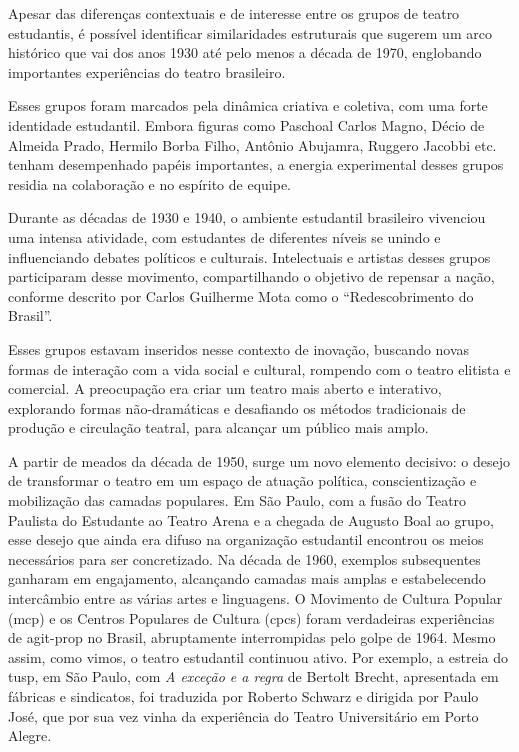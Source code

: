 \subject{Arco histórico}

Apesar das diferenças contextuais e de interesse entre os grupos de
teatro estudantis, é possível identificar similaridades estruturais que
sugerem um arco histórico que vai dos anos 1930 até pelo menos a década
de 1970, englobando importantes experiências do teatro brasileiro.

Esses grupos foram marcados pela dinâmica criativa e coletiva, com uma
forte identidade estudantil. Embora figuras como Paschoal Carlos Magno,
Décio de Almeida Prado, Hermilo Borba Filho, Antônio Abujamra, Ruggero
Jacobbi etc. tenham desempenhado papéis importantes, a energia
experimental desses grupos residia na colaboração e no espírito de
equipe.

Durante as décadas de 1930 e 1940, o ambiente estudantil brasileiro
vivenciou uma intensa atividade, com estudantes de diferentes níveis se
unindo e influenciando debates políticos e culturais. Intelectuais e
artistas desses grupos participaram desse movimento, compartilhando o
objetivo de repensar a nação, conforme descrito por Carlos Guilherme
Mota como o “Redescobrimento do Brasil”.

Esses grupos estavam inseridos nesse contexto de inovação, buscando
novas formas de interação com a vida social e cultural, rompendo com o
teatro elitista e comercial. A preocupação era criar um teatro mais
aberto e interativo, explorando formas não-dramáticas e desafiando os
métodos tradicionais de produção e circulação teatral, para alcançar um
público mais amplo.

A partir de meados da década de 1950, surge um novo elemento decisivo: o
desejo de transformar o teatro em um espaço de atuação política,
conscientização e mobilização das camadas populares. Em São Paulo, com a
fusão do Teatro Paulista do Estudante ao Teatro Arena e a chegada de
Augusto Boal ao grupo, esse desejo que ainda era difuso na organização
estudantil encontrou os meios necessários para ser concretizado. Na
década de 1960, exemplos subsequentes ganharam em engajamento,
alcançando camadas mais amplas e estabelecendo intercâmbio entre as
várias artes e linguagens. O Movimento de Cultura Popular ({\sc mcp}) e os
Centros Populares de Cultura ({\sc cpc}s) foram verdadeiras experiências de
agit-prop no Brasil, abruptamente interrompidas pelo golpe de 1964.
Mesmo assim, como vimos, o teatro estudantil continuou ativo. Por
exemplo, a estreia do {\sc tusp}, em São Paulo, com {\it A exceção e a regra}
de Bertolt Brecht, apresentada em fábricas e sindicatos, foi traduzida
por Roberto Schwarz e dirigida por Paulo José, que por sua vez vinha da
experiência do Teatro Universitário em Porto Alegre.

